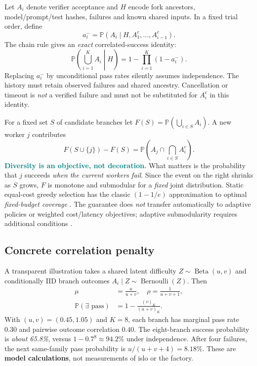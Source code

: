 \documentclass[10pt,twocolumn]{article}
\newcommand{\Claim}[1]{\noindent\textcolor{teal}{\textbf{#1}}\;}
\newcommand{\1}{\mathbf{1}}
\newcommand{\Prb}{\mathbb{P}}
\begin{document}
Let $A_i$ denote verifier acceptance and $H$ encode fork ancestors, model/prompt/test hashes, failures and known shared inputs. In a fixed trial order, define
\begin{equation}
 a_i^- =\Prb(A_i\mid H, A_1^c,\ldots,A_{i-1}^c).
\end{equation}
The chain rule gives an \emph{exact} correlated-success identity:
\begin{equation}
\label{eq:chain}
\boxed{\Prb\!\left(\bigcup_{i=1}^K A_i\middle|H\right)
=1-\prod_{i=1}^{K}(1-a_i^-).}
\end{equation}
Replacing $a_i^-$ by unconditional pass rates silently assumes independence. The history must retain observed failures and shared ancestry. Cancellation or timeout is \emph{not} a verified failure and must not be substituted for $A_i^c$ in this identity.

For a fixed set $S$ of candidate branches let $F(S)=\Prb(\bigcup_{i\in S}A_i)$. A new worker $j$ contributes
\begin{equation}
\label{eq:marginal}
\boxed{F(S\cup\{j\})-F(S)
=\Prb\!\left(A_j\cap\!\bigcap_{i\in S}A_i^c\right).}
\end{equation}
\Claim{Diversity is an objective, not decoration.} What matters is the probability that $j$ succeeds \emph{when the current workers fail}. Since the event on the right shrinks as $S$ grows, $F$ is monotone and submodular for a \emph{fixed} joint distribution. Static equal-cost greedy selection has the classic $(1-1/e)$ approximation to optimal \emph{fixed-budget coverage} \cite{nemhauser}. The guarantee does \emph{not} transfer automatically to adaptive policies or weighted cost/latency objectives; adaptive submodularity requires additional conditions \cite{golovin}.

\subsection{Concrete correlation penalty}
A transparent illustration takes a shared latent difficulty $Z\sim\operatorname{Beta}(u,v)$ and conditionally IID branch outcomes $A_i\mid Z\sim\operatorname{Bernoulli}(Z)$. Then
\begin{equation}
\begin{aligned}
\mu&=\frac{u}{u+v},\quad \rho=\frac1{u+v+1},\\
\Prb(\exists\text{ pass})&=1-\frac{(v)_K}{(u+v)_K}.
\end{aligned}
\end{equation}
With $(u,v)=(0.45,1.05)$ and $K=8$, each branch has marginal pass rate $0.30$ and pairwise outcome correlation $0.40$. The eight-branch success probability is \emph{about 65.8\%}, versus $1-0.7^8\approx94.2\%$ under independence. After four failures, the next same-family pass probability is $u/(u+v+4)=8.18\%$. These are \textbf{model calculations}, not measurements of islo or the factory.
\end{document}
